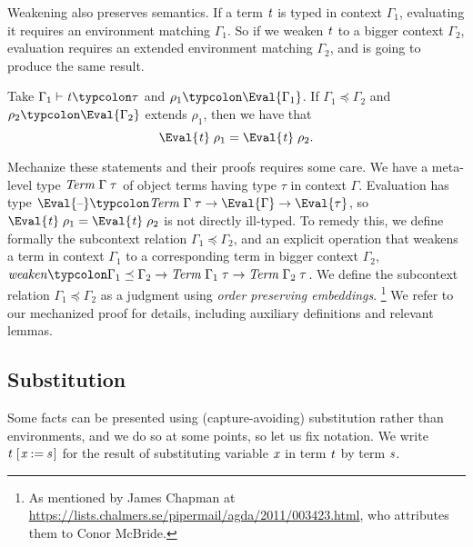 Weakening also preserves semantics. If a term \ensuremath{\Varid{t}} is typed in
context \ensuremath{\Gamma_{1}}, evaluating it requires an environment matching
\ensuremath{\Gamma_{1}}. So if we weaken \ensuremath{\Varid{t}} to a bigger context \ensuremath{\Gamma_{2}},
evaluation requires an extended environment matching \ensuremath{\Gamma_{2}},
and is going to produce the same result.
\begin{lemma}
  \label{lem:weaken-sound}
  Take \ensuremath{\Gamma_{1}\vdash\Varid{t}\typcolon\tau} and \ensuremath{\rho_{1}\typcolon\Eval{\Gamma_{1}}}. If \ensuremath{\Gamma_{1}\preceq\Gamma_{2}} and \ensuremath{\rho_{2}\typcolon\Eval{\Gamma_{2}}} extends \ensuremath{\rho_{1}}, then
  we have that
  \[\ensuremath{\Eval{\Varid{t}}\;\rho_{1}\mathrel{=}\Eval{\Varid{t}}\;\rho_{2}}.\]
\end{lemma}

Mechanize these statements and their proofs requires some care.
We have a meta-level type \ensuremath{\Conid{Term}\;\Gamma\;\tau} of object terms having
type \ensuremath{\tau} in context \ensuremath{\Gamma}. Evaluation has type \ensuremath{\Eval{\text{\textendash}}\typcolon\Conid{Term}\;\Gamma\;\tau\to \Eval{\Gamma}\to \Eval{\tau}}, so \ensuremath{\Eval{\Varid{t}}\;\rho_{1}\mathrel{=}\Eval{\Varid{t}}\;\rho_{2}} is not directly ill-typed.
%
To remedy this, we define formally the subcontext relation
\ensuremath{\Gamma_{1}\preceq\Gamma_{2}}, and an explicit operation that weakens
a term in context \ensuremath{\Gamma_{1}} to a corresponding term in bigger
context \ensuremath{\Gamma_{2}}, \ensuremath{\Varid{weaken}\typcolon\Gamma_{1}\preceq\Gamma_{2}\to \Conid{Term}\;\Gamma_{1}\;\tau\to \Conid{Term}\;\Gamma_{2}\;\tau}.
%
We define the subcontext relation \ensuremath{\Gamma_{1}\preceq\Gamma_{2}} as a
judgment using \emph{order preserving embeddings}.%
\footnote{As mentioned by James Chapman at
  \url{https://lists.chalmers.se/pipermail/agda/2011/003423.html},
  who attributes them to Conor McBride.} We refer to our
mechanized proof for details, including auxiliary definitions and
relevant lemmas.

\subsection{Substitution}
Some facts can be presented using (capture-avoiding) substitution
rather than environments, and we do so at some points, so let us
fix notation. We write \ensuremath{\Varid{t}\;[\mskip1.5mu \Varid{x}\mathbin{:=}\Varid{s}\mskip1.5mu]} for the result of
substituting variable \ensuremath{\Varid{x}} in term \ensuremath{\Varid{t}} by term \ensuremath{\Varid{s}}.

